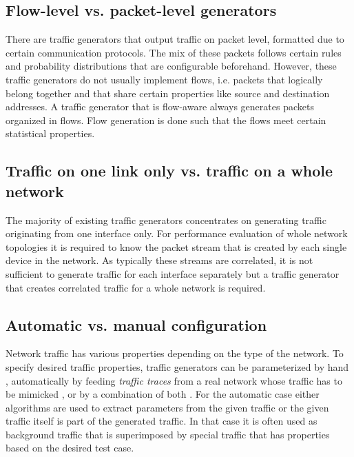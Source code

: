 \documentclass[journal,10pt]{IEEEtran}
\begin{document}
\subsection{Flow-level vs. packet-level generators}
There are traffic generators that output traffic on packet level, formatted due to 
certain communication protocols. The mix of these packets follows certain rules and probability distributions that are configurable beforehand.
However, these traffic generators \cite{itg, d-itg, rude} do not usually implement flows, i.e. packets that logically belong together and that
share certain properties like source and destination addresses. 
A traffic generator that is flow-aware \cite{swing,barakat2003modeling,conf/sigmetrics/SommersKB04} always generates packets organized in flows.
Flow generation is done such that the flows meet certain statistical properties.

\subsection{Traffic on one link only vs. traffic on a whole network}
The majority of existing traffic generators concentrates on generating traffic originating from one interface only.
For performance evaluation of whole network topologies it is required to know the packet stream that is created by each single device in the network.
As typically these streams are correlated, it is not sufficient to generate traffic for each interface separately but a traffic generator that 
creates correlated traffic for a whole network is required.

\subsection{Automatic vs. manual configuration}
Network traffic has various properties depending on the type of the network. 
To specify desired traffic properties, traffic generators can be parameterized by hand \cite{heegaard2000gensyn},
automatically by feeding \emph{traffic traces} from a real network whose traffic 
has to be mimicked \cite{weigle2006tmix, conf/sigmetrics/SommersKB04, Siska:2010:FTG:1815396.1815503}, or 
by a combination of both \cite{conf/sigmetrics/SommersKB04, Siska:2010:FTG:1815396.1815503}.
For the automatic case either algorithms are used to extract parameters from the given traffic or the given traffic
itself is part of the generated traffic. In that case it is often used as background traffic that is superimposed by 
special traffic that has properties based on the desired test case.
\end{document}
